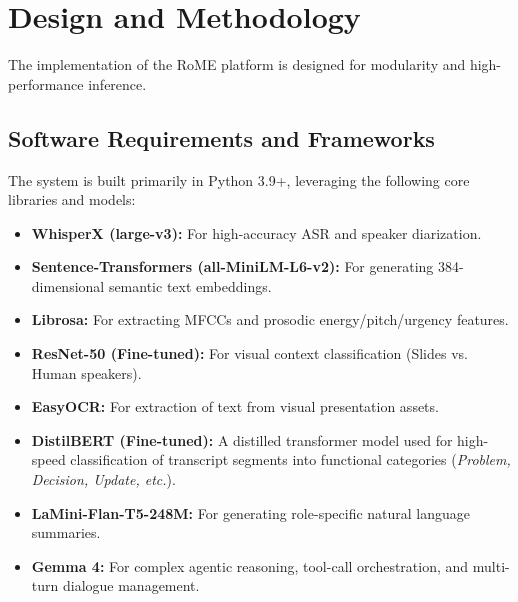 \chapter{Design and Methodology}
\noindent
The implementation of the RoME platform is designed for modularity and high-performance inference.

\section{Software Requirements and Frameworks}
The system is built primarily in Python 3.9+, leveraging the following core libraries and models:
\begin{itemize}
    \item \textbf{WhisperX (large-v3):} For high-accuracy ASR and speaker diarization.
    \item \textbf{Sentence-Transformers (all-MiniLM-L6-v2):} For generating 384-dimensional semantic text embeddings.
    \item \textbf{Librosa:} For extracting MFCCs and prosodic energy/pitch/urgency features.
    \item \textbf{ResNet-50 (Fine-tuned):} For visual context classification (Slides vs. Human speakers).
    \item \textbf{EasyOCR:} For extraction of text from visual presentation assets.
    \item \textbf{DistilBERT (Fine-tuned):} A distilled transformer model used for high-speed classification of transcript segments into functional categories (\textit{Problem, Decision, Update, etc.}).
    \item \textbf{LaMini-Flan-T5-248M:} For generating role-specific natural language summaries.
    \item \textbf{Gemma 4:} For complex agentic reasoning, tool-call orchestration, and multi-turn dialogue management.
\end{itemize}

